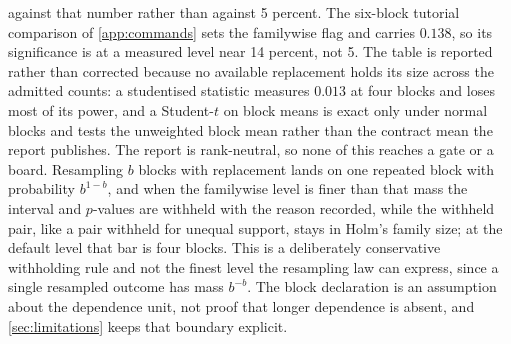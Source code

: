 against that number rather than against 5 percent. The six-block tutorial comparison of \cref{app:commands} sets the familywise flag and carries $0.138$, so its significance is at a measured level near 14 percent, not 5. The table is reported rather than corrected because no available replacement holds its size across the admitted counts: a studentised statistic measures $0.013$ at four blocks and loses most of its power, and a Student-$t$ on block means is exact only under normal blocks and tests the unweighted block mean rather than the contract mean the report publishes. The report is rank-neutral, so none of this reaches a gate or a board. Resampling $b$ blocks with replacement lands on one repeated block with probability $b^{1-b}$, and when the familywise level is finer than that mass the interval and $p$-values are withheld with the reason recorded, while the withheld pair, like a pair withheld for unequal support, stays in Holm's family size; at the default level that bar is four blocks. This is a deliberately conservative withholding rule and not the finest level the resampling law can express, since a single resampled outcome has mass $b^{-b}$. The block declaration is an assumption about the dependence unit, not proof that longer dependence is absent, and \cref{sec:limitations} keeps that boundary explicit.

